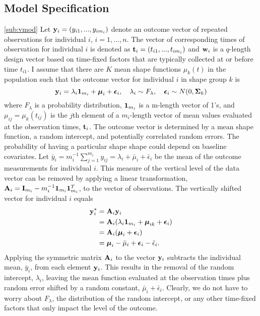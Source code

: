 \subsection{Model Specification}\ref{sub:vmod}
 Let $\mathbf y_{i}=(y_{i1},...,y_{im_{i}})$ denote an outcome vector of repeated observations for individual $i$, $i=1,...,n$. The vector of corresponding times of observation for individual $i$ is denoted as $\mathbf t_{i}=(t_{i1},...,t_{im_{i}})$ and $\mathbf w_{i}$ is a $q$-length design vector based on time-fixed factors that are typically collected at or before time $t_{i1}$. I assume that there are $K$ mean shape functions $\mu_{k}(t)$ in the population such that the outcome vector for individual $i$ in shape group $k$ is
 $$\mathbf y_{i} = \lambda_{i}\mathbf 1_{m_{i}}+\boldsymbol\mu_{i}+\boldsymbol\epsilon_{i},\quad \lambda_{i}\sim F_{\lambda}, \quad \boldsymbol\epsilon_{i}\sim N(0,\boldsymbol\Sigma_{k})$$
 where $F_{\lambda}$ is a probability distribution, $\mathbf 1_{m_{i}}$ is a m-length vector of 1's, and $\mu_{ij} = \mu_{k}(t_{ij})$ is the $j$th element of a $m_{i}$-length vector of mean values evaluated at the observation times, $\mathbf t_{i}$. The outcome vector is determined by a mean shape function, a random intercept, and potentially correlated random errors. The probability of having a particular shape shape could depend on baseline covariates. Let $\bar{y}_{i}= m_{i}^{-1}\sum^{m_{i}}_{j=1} y_{ij} = \lambda_{i}+\bar{\mu}_{i}+\bar{\epsilon}_{i}$ be the mean of the outcome measurements for individual $i$. This measure of the vertical level of the data vector can be removed by applying a linear transformation, $\mathbf A_{i} = \mathbf I_{m_{i}} - m_{i}^{-1}\mathbf 1_{m_{i}}\mathbf 1_{m_{i}}^{T}$, to the vector of observations. The vertically shifted vector for individual $i$ equals 
\begin{align*}
\mathbf y^{*}_{i} &= \mathbf A_{i}\mathbf y_{i}\\
&=\mathbf A_{i}(\lambda_{i}\mathbf 1_{m_{i}}+\boldsymbol\mu_{ik}+\boldsymbol\epsilon_{i})\\
&=\mathbf A_{i}(\boldsymbol\mu_{i}+\boldsymbol\epsilon_{i})\\
&=\boldsymbol\mu_{i} - \bar{\mu}_{i}+\boldsymbol\epsilon_{i}-\bar{\epsilon}_{i}.
\end{align*}
Applying the symmetric matrix $\mathbf A_{i}$ to the vector $\mathbf y_{i}$ subtracts the individual mean, $\bar{y}_{i}$, from each element $\mathbf y_{i}$. This results in the removal of the random intercept, $\lambda_{i}$, leaving the mean function evaluated at the observation times plus random error shifted by a random constant, $\bar{\mu}_{i}+\bar{\epsilon}_{i}$. Clearly, we do not have to worry about $F_{\lambda}$, the distribution of the random intercept, or any other time-fixed factors that only impact the level of the outcome. 

